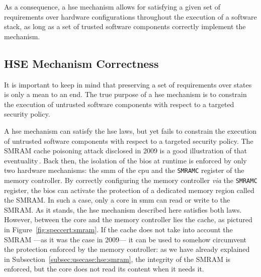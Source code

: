 As a consequence, a \ac{hse} mechanism allows for satisfying a given set of
requirements over hardware configurations throughout the execution of a software
stack, as long as a set of trusted software components correctly implement the
mechanism.

\subsection{HSE Mechanism Correctness}
\label{subsec:speccert:security}

It is important to keep in mind that preserving a set of requirements over
states is only a mean to an end.
%
The true purpose of a \ac{hse} mechanism is to constrain the execution of
untrusted software components with respect to a targeted security policy.

A \ac{hse} mechanism can satisfy the \ac{hse} laws, but yet fails to constrain
the execution of untrusted software components with respect to a targeted
security policy.
%
The SMRAM cache poisoning attack disclosed in 2009 is a good illustration of
that eventuality\,\cite{duflot2009smram,wojtczuk2009smram}.
%
Back then, the isolation of the \ac{bios} at runtime is enforced by only two
hardware mechanisms: the \ac{smm} of the \ac{cpu} and the \texttt{SMRAMC}
register of the memory controller.
%
By correctly configuring the memory controller \emph{via} the \texttt{SMRAMC}
register, the \ac{bios} can activate the protection of a dedicated memory region
called the SMRAM.
%
In such a case, only a core in \ac{smm} can read or write to the SMRAM.
%
As it stands, the \ac{hse} mechanism described here satisfies both laws. 
%
However, between the core and the memory controller lies the cache, as pictured
in Figure~\ref{fig:speccert:smram}.
%
If the cache does not take into account the SMRAM ---as it was the case in
2009--- it can be used to somehow circumvent the protection enforced by the
memory controller: as we have already explained in
Subsection~\ref{subsec:usecase:hse:smram}, the integrity of the SMRAM is
enforced, but the core does not read its content when it needs it. 

